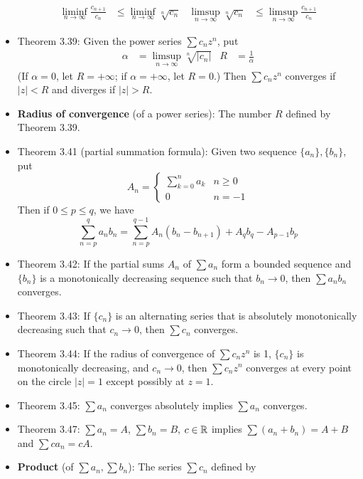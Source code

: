 \documentclass[../../notes.tex]{subfiles}
\begin{document}
\begin{itemize}
    \begin{align*}
        \liminf_{n\to\infty}\frac{c_{n+1}}{c_n} &\leq \liminf_{n\to\infty}\sqrt[n]{c_n}&
        \limsup_{n\to\infty}\sqrt[n]{c_n} &\leq \limsup_{n\to\infty}\frac{c_{n+1}}{c_n}
    \end{align*}
    \item Theorem 3.39: Given the power series $\sum c_nz^n$, put
    \begin{align*}
        \alpha &= \limsup_{n\to\infty}\sqrt[n]{|c_n|}&
        R &= \frac{1}{\alpha}
    \end{align*}
    (If $\alpha=0$, let $R=+\infty$; if $\alpha=+\infty$, let $R=0$.) Then $\sum c_nz^n$ converges if $|z|<R$ and diverges if $|z|>R$.
    \item \textbf{Radius of convergence} (of a power series): The number $R$ defined by Theorem 3.39.
    \item Theorem 3.41 (partial summation formula): Given two sequence $\{a_n\},\{b_n\}$, put
    \begin{equation*}
        A_n =
        \begin{cases}
            \sum_{k=0}^na_k & n\geq 0\\
            0 & n=-1
        \end{cases}
    \end{equation*}
    Then if $0\leq p\leq q$, we have
    \begin{equation*}
        \sum_{n=p}^qa_nb_n = \sum_{n=p}^{q-1}A_n(b_n-b_{n+1})+A_qb_q-A_{p-1}b_p
    \end{equation*}
    \item Theorem 3.42: If the partial sums $A_n$ of $\sum a_n$ form a bounded sequence and $\{b_n\}$ is a monotonically decreasing sequence such that $b_n\to 0$, then $\sum a_nb_n$ converges.
    \item Theorem 3.43: If $\{c_n\}$ is an alternating series that is absolutely monotonically decreasing such that $c_n\to 0$, then $\sum c_n$ converges.
    \item Theorem 3.44: If the radius of convergence of $\sum c_nz^n$ is 1, $\{c_n\}$ is monotonically decreasing, and $c_n\to 0$, then $\sum c_nz^n$ converges at every point on the circle $|z|=1$ except possibly at $z=1$.
    \item Theorem 3.45: $\sum a_n$ converges absolutely implies $\sum a_n$ converges.
    \item Theorem 3.47: $\sum a_n=A$, $\sum b_n=B$, $c\in\mathbb{R}$ implies $\sum(a_n+b_n)=A+B$ and $\sum ca_n=cA$.
    \item \textbf{Product} (of $\sum a_n,\sum b_n$): The series $\sum c_n$ defined by

\end{itemize}
\end{document}
